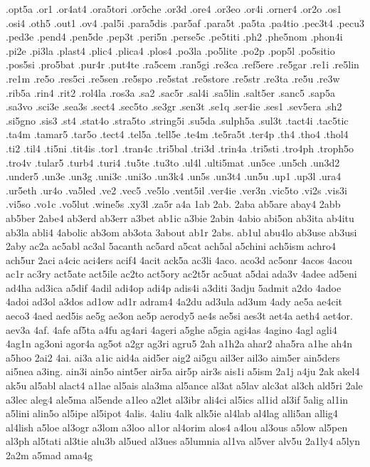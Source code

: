 {.opt5a
.or1
.or4at4
.ora5tori
.or5che
.or3d
.ore4
.or3eo
.or4i
.orner4
.or2o
.os1
.osi4
.oth5
.out1
.ov4
.pal5i
.para5dis
.par5af
.para5t
.pa5ta
.pa4tio
.pec3t4
.pecu3
.ped3e
.pend4
.pen5de
.pep3t
.peri5n
.perse5c
.pe5titi
.ph2
.phe5nom
.phon4i
.pi2e
.pi3la
.plast4
.plic4
.plica4
.plos4
.po3la
.po5lite
.po2p
.pop5l
.po5sitio
.pos5si
.pro5bat
.pur4r
.put4te
.ra5cem
.ran5gi
.re3ca
.ref5ere
.re5gar
.re1i
.re5lin
.re1m
.re5o
.res5ci
.re5sen
.re5spo
.re5stat
.re5store
.re5str
.re3ta
.re5u
.re3w
.rib5a
.rin4
.rit2
.rol4la
.ros3a
.sa2
.sac5r
.sal4i
.sa5lin
.salt5er
.sanc5
.sap5a
.sa3vo
.sci3e
.sea3s
.sect4
.sec5to
.se3gr
.sen3t
.se1q
.ser4ie
.ses1
.sev5era
.sh2
.si5gno
.sis3
.st4
.stat4o
.stra5to
.string5i
.su5da
.sulph5a
.sul3t
.tact4i
.tac5tic
.ta4m
.tamar5
.tar5o
.tect4
.tel5a
.tell5e
.te4m
.te5ra5t
.ter4p
.th4
.tho4
.thol4
.ti2
.til4
.ti5ni
.tit4is
.tor1
.tran4c
.tri5bal
.tri3d
.trin4a
.tri5sti
.tro4ph
.troph5o
.tro4v
.tular5
.turb4
.turi4
.tu5te
.tu3to
.ul4l
.ulti5mat
.un5ce
.un5ch
.un3d2
.under5
.un3e
.un3g
.uni3c
.uni3o
.un3k4
.un5s
.un3t4
.un5u
.up1
.up3l
.ura4
.ur5eth
.ur4o
.va5led
.ve2
.vec5
.ve5lo
.vent5il
.ver4ie
.ver3n
.vic5to
.vi2s
.vis3i
.vi5so
.vo1c
.vo5lut
.wine5s
.xy3l
.za5r
a4a
1ab
2ab.
2aba
ab5are
abay4
2abb
ab5ber
2abe4
ab3erd
ab3err
a3bet
ab1ic
a3bie
2abin
4abio
abi5on
ab3ita
ab4itu
ab3la
abli4
4abolic
ab3om
ab3ota
3about
ab1r
2abs.
ab1ul
abu4lo
ab3use
ab3usi
2aby
ac2a
ac5abl
ac3al
5acanth
ac5ard
a5cat
ach5al
a5chini
ach5ism
achro4
ach5ur
2aci
a4cic
aci4ers
acif4
4acit
ack5a
ac3li
4aco.
aco3d
ac5onr
4acos
4acou
ac1r
ac3ry
act5ate
act5ile
ac2to
act5ory
ac2t5r
ac5uat
a5dai
ada3v
4adee
ad5eni
ad4ha
ad3ica
a5dif
4adil
adi4op
adi4p
adis4i
a3diti
3adju
5admit
a2do
4adoe
4adoi
ad3ol
a3dos
ad1ow
ad1r
adram4
4a2du
ad3ula
ad3um
4ady
ae5a
ae4cit
aeco3
4aed
aed5is
ae5g
ae3on
ae5p
aerody5
ae4s
ae5si
aes3t
aet4a
aeth4
aet4or.
aev3a
4af.
4afe
af5ta
a4fu
ag4ari
4ageri
a5ghe
a5gia
agi4as
4agino
4agl
agli4
4ag1n
ag3oni
agor4a
ag5ot
a2gr
ag3ri
agru5
2ah
a1h2a
ahar2
aha5ra
a1he
ah4n
a5hoo
2ai2
4ai.
ai3a
a1ic
aid4a
aid5er
aig2
ai5gu
ail3er
ail3o
aim5er
ain5ders
ai5nea
a3ing.
ain3i
ain5o
aint5er
air5a
air5p
air3s
ais1i
a5ism
2a1j
a4ju
2ak
akel4
ak5u
al5abl
alact4
a1lae
al5ais
ala3ma
al5ance
al3at
a5lav
alc3at
al3ch
ald5ri
2ale
a3lec
aleg4
ale5ma
al5ende
a1leo
a2let
al3ibr
ali4ci
al5ics
al1id
al3if
5alig
al1in
a5lini
alin5o
al5ipe
al5ipot
4alis.
4aliu
4alk
alk5ie
al4lab
al4lag
alli5an
allig4
al4lish
a5loe
al3ogr
a3lom
a3loo
al1or
al4orim
alos4
a4lou
al3ous
a5low
al5pen
al3ph
al5tati
al3tie
alu3b
al5ued
al3ues
a5lumnia
al1va
al5ver
alv5u
2a1ly4
a5lyn
2a2m
a5mad
ama4g
}

